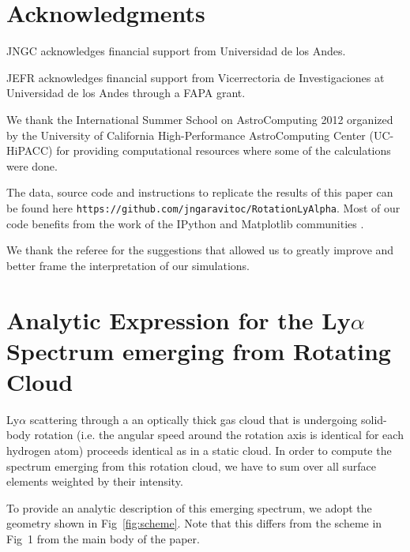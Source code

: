 \documentclass{emulateapj}
\begin{document}
\section*{Acknowledgments}

JNGC acknowledges financial support from Universidad de los
Andes. 

JEFR acknowledges financial support from Vicerrectoria de
Investigaciones at Universidad de los Andes through a FAPA grant.

We thank the International Summer School on AstroComputing
2012 organized by the University of California High-Performance
AstroComputing Center (UC-HiPACC) for providing computational
resources where some of the calculations were done. 

The data, source code and instructions to
replicate the results of this paper can be found
here {\texttt{https://github.com/jngaravitoc/RotationLyAlpha}}.
Most of our code benefits from the work of the IPython and Matplotlib
communities \citep{IPython,matplotlib}.

We thank the referee for the suggestions that allowed us to greatly
improve and better frame the interpretation of our simulations. 


\appendix
\section{Analytic Expression for the Ly$\alpha$ Spectrum
  emerging from Rotating Cloud}  


Ly$\alpha$ scattering through a an optically thick gas cloud that is
undergoing solid-body rotation (i.e. the angular speed around the
rotation axis is identical for each hydrogen atom) proceeds identical
as in a static cloud. 
In order to compute the spectrum emerging from this rotation cloud, we
have to sum over all surface elements weighted by their intensity.  

To provide an analytic description of this emerging spectrum, we adopt
the geometry shown in Fig~\ref{fig:scheme}. 
Note that this differs from the scheme in Fig~1 from the main body of
the paper. 
\end{document}
